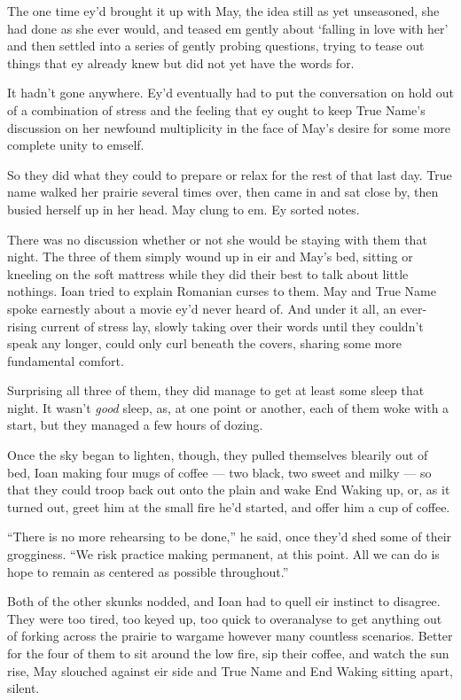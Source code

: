 The one time ey'd brought it up with May, the idea still as yet unseasoned, she had done as she ever would, and teased em gently about `falling in love with her' and then settled into a series of gently probing questions, trying to tease out things that ey already knew but did not yet have the words for.

It hadn't gone anywhere. Ey'd eventually had to put the conversation on hold out of a combination of stress and the feeling that ey ought to keep True Name's discussion on her newfound multiplicity in the face of May's desire for some more complete unity to emself.

So they did what they could to prepare or relax for the rest of that last day. True name walked her prairie several times over, then came in and sat close by, then busied herself up in her head. May clung to em. Ey sorted notes.

There was no discussion whether or not she would be staying with them that night. The three of them simply wound up in eir and May's bed, sitting or kneeling on the soft mattress while they did their best to talk about little nothings. Ioan tried to explain Romanian curses to them. May and True Name spoke earnestly about a movie ey'd never heard of. And under it all, an ever-rising current of stress lay, slowly taking over their words until they couldn't speak any longer, could only curl beneath the covers, sharing some more fundamental comfort.

Surprising all three of them, they did manage to get at least some sleep that night. It wasn't \emph{good} sleep, as, at one point or another, each of them woke with a start, but they managed a few hours of dozing.

Once the sky began to lighten, though, they pulled themselves blearily out of bed, Ioan making four mugs of coffee — two black, two sweet and milky — so that they could troop back out onto the plain and wake End Waking up, or, as it turned out, greet him at the small fire he'd started, and offer him a cup of coffee.

``There is no more rehearsing to be done,'' he said, once they'd shed some of their grogginess. ``We risk practice making permanent, at this point. All we can do is hope to remain as centered as possible throughout.''

Both of the other skunks nodded, and Ioan had to quell eir instinct to disagree. They were too tired, too keyed up, too quick to overanalyse to get anything out of forking across the prairie to wargame however many countless scenarios. Better for the four of them to sit around the low fire, sip their coffee, and watch the sun rise, May slouched against eir side and True Name and End Waking sitting apart, silent.

